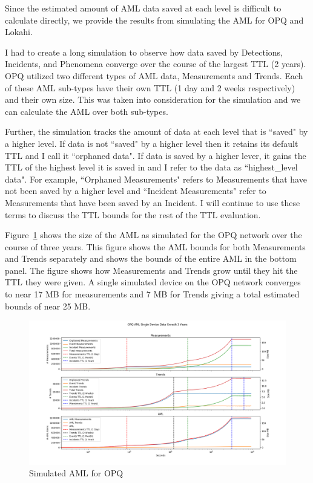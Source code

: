 Since the estimated amount of AML data saved at each level is difficult to calculate directly, we provide the results from simulating the AML for OPQ and Lokahi.

I had to create a long simulation to observe how data saved by Detections, Incidents, and Phenomena converge over the course of the largest TTL (2 years). OPQ utilized two different types of AML data, Measurements and Trends. Each of these AML sub-types have their own TTL (1 day and 2 weeks respectively) and their own size. This was taken into consideration for the simulation and we can calculate the AML over both sub-types.

Further, the simulation tracks the amount of data at each level that is ``saved" by a higher level. If data is not ``saved" by a higher level then it retains its default TTL and I call it ``orphaned data". If data is saved by a higher lever, it gains the TTL of the highest level it is saved in and I refer to the data as ``highest\_level data". For example, ``Orphaned Measurements" refers to Measurements that have not been saved by a higher level and ``Incident Measurements" refer to Measurements that have been saved by an Incident. I will continue to use these terms to discuss the TTL bounds for the rest of the TTL evaluation.

Figure~\ref{fig:sim_aml_opq} shows the size of the AML as simulated for the OPQ network over the course of three years. This figure shows the AML bounds for both Measurements and Trends separately and shows the bounds of the entire AML in the bottom panel. The figure shows how Measurements and Trends grow until they hit the TTL they were given. A single simulated device on the OPQ network converges to near 17 MB for measurements and 7 MB for Trends giving a total estimated bounds of near 25 MB\@.

\begin{figure}[H]
	\centering
	\includegraphics[width=\linewidth]{figures/sim_aml_opq.png}
	\caption{Simulated AML for OPQ}
	\label{fig:sim_aml_opq}
\end{figure}

